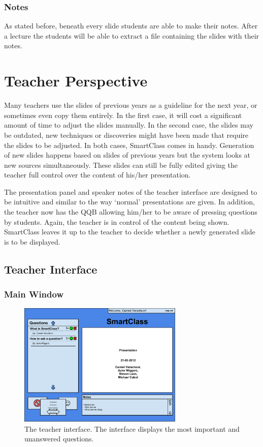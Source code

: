 \documentclass[11pt]{article}
\begin{document}
\subsubsection{Notes}
As stated before, beneath every slide students are able to make their notes. After a lecture the students will be able to extract a file containing the slides with their notes. 


\section{Teacher Perspective}
Many teachers use the slides of previous years as a guideline for the next year, or sometimes even copy them entirely. In the first case, it will cost a significant amount of time to adjust the slides manually. In the second case, the slides may be outdated, new techniques or discoveries might have been made that require the slides to be adjusted. In both cases, SmartClass comes in handy.  Generation of new slides happens based on slides of previous years but the system looks at new sources simultaneously. These slides can still be fully edited giving the teacher full control over the content of his/her presentation.

The presentation panel and speaker notes of the teacher interface are designed to be intuitive and similar to the way `normal' presentations are given. In addition, the teacher now has the QQB allowing him/her to be aware of pressing questions by students. Again, the teacher is in control of the content being shown. SmartClass leaves it up to the teacher to decide whether a newly generated slide is to be displayed. 

\subsection{Teacher Interface}
\subsubsection{Main Window}

\begin{figure}[!h]
\centering
\includegraphics[width=0.7\textwidth]{teacherInterface.pdf}
\caption{The teacher interface. The interface displays the most important and unanswered questions.}
\label{teacherInterface}
\end{figure}
\end{document}
